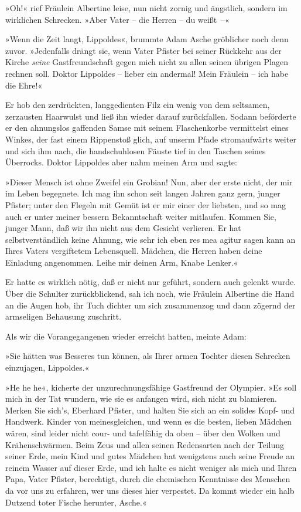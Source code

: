 »Oh!« rief Fräulein Albertine leise, nun nicht zornig und
ängstlich, sondern im wirklichen Schrecken. »Aber Vater – die
Herren – du weißt~–«

»Wenn die Zeit langt, Lippoldes«, brummte Adam Asche gröblicher
noch denn zuvor. »Jedenfalls drängt sie, wenn Vater Pfister bei
seiner Rückkehr aus der Kirche \emph{seine} Gastfreundschaft gegen
mich nicht zu allen seinen übrigen Plagen rechnen soll. Doktor
Lippoldes – lieber ein andermal! Mein Fräulein – ich habe die
Ehre!«

Er hob den zerdrückten, langgedienten Filz ein wenig von dem
seltsamen, zerzausten Haarwulst und ließ ihn wieder darauf
zurückfallen. Sodann beförderte er den ahnungslos gaffenden Samse
mit seinem Flaschenkorbe vermittelst eines Winkes, der fast einem
Rippenstoß glich, auf unserm Pfade stromaufwärts weiter und sich
ihm nach, die handschuhlosen Fäuste tief in den Taschen seines
Überrocks. Doktor Lippoldes aber nahm meinen Arm und sagte:

»Dieser Mensch ist ohne Zweifel ein Grobian! Nun, aber der erste
nicht, der mir im Leben begegnete. Ich mag ihn schon seit langen
Jahren ganz gern, junger Pfister; unter den Flegeln mit Gemüt ist
er mir einer der liebsten, und so mag auch er unter meiner bessern
Bekanntschaft weiter mitlaufen. Kommen Sie, junger Mann, daß wir
ihn nicht aus dem Gesicht verlieren. Er hat selbstverständlich
keine Ahnung, wie sehr ich eben res mea agitur sagen kann an Ihres
Vaters vergiftetem Lebensquell. Mädchen, die Herren haben deine
Einladung angenommen. Leihe mir deinen Arm, Knabe Lenker.«

Er hatte es wirklich nötig, daß er nicht nur geführt, sondern auch
gelenkt wurde. Über die Schulter zurückblickend, sah ich noch, wie
Fräulein Albertine die Hand an die Augen hob, ihr Tuch dichter um
sich zusammenzog und dann zögernd der armseligen Behausung
zuschritt.

Als wir die Vorangegangenen wieder erreicht hatten, meinte Adam:

»Sie hätten was Besseres tun können, als Ihrer armen Tochter diesen
Schrecken einzujagen, Lippoldes.«

»He he he«, kicherte der unzurechnungsfähige Gastfreund der
Olympier. »Es soll mich in der Tat wundern, wie sie es anfangen
wird, sich nicht zu blamieren. Merken Sie sich's, Eberhard Pfister,
und halten Sie sich an ein solides Kopf- und Handwerk. Kinder von
meinesgleichen, und wenn es die besten, lieben Mädchen wären, sind
leider nicht cour- und tafelfähig da oben – über den Wolken und
Krähenschwärmen. Beim Zeus und allen seinen Redensarten nach der
Teilung seiner Erde, mein Kind und gutes Mädchen hat wenigstens
auch seine Freude an reinem Wasser auf dieser Erde, und ich halte
es nicht weniger als mich und Ihren Papa, Vater Pfister,
berechtigt, durch die chemischen Kenntnisse des Menschen da vor uns
zu erfahren, wer uns dieses hier verpestet. Da kommt wieder ein
halb Dutzend toter Fische herunter, Asche.«

